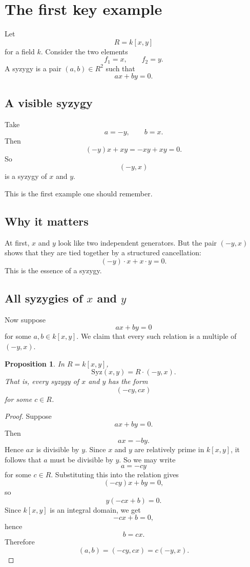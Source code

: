 \documentclass[11pt]{article}
\newtheorem{proposition}[theorem]{Proposition}
\theoremstyle{definition}
\theoremstyle{remark}
\newcommand{\Syz}{\mathrm{Syz}}
\begin{document}
	\section{The first key example}
	
	Let
	\[
	R = k[x,y]
	\]
	for a field \(k\). Consider the two elements
	\[
	f_1=x,\qquad f_2=y.
	\]
	A syzygy is a pair \((a,b)\in R^2\) such that
	\[
	ax+by=0.
	\]
	
	\subsection{A visible syzygy}
	
	Take
	\[
	a=-y,\qquad b=x.
	\]
	Then
	\[
	(-y)x + x y = -xy+xy=0.
	\]
	So
	\[
	(-y,x)
	\]
	is a syzygy of \(x\) and \(y\).
	
	This is the first example one should remember.
	
	\subsection{Why it matters}
	
	At first, \(x\) and \(y\) look like two independent generators. But the pair \((-y,x)\) shows that they are tied together by a structured cancellation:
	\[
	(-y)\cdot x + x\cdot y = 0.
	\]
	This is the essence of a syzygy.
	
	\subsection{All syzygies of \(x\) and \(y\)}
	
	Now suppose
	\[
	ax+by=0
	\]
	for some \(a,b\in k[x,y]\). We claim that every such relation is a multiple of \((-y,x)\).
	
	\begin{proposition}
		In \(R=k[x,y]\),
		\[
		\Syz(x,y)=R\cdot(-y,x).
		\]
		That is, every syzygy of \(x\) and \(y\) has the form
		\[
		(-cy,cx)
		\]
		for some \(c\in R\).
	\end{proposition}
	
	\begin{proof}
		Suppose
		\[
		ax+by=0.
		\]
		Then
		\[
		ax=-by.
		\]
		Hence \(ax\) is divisible by \(y\). Since \(x\) and \(y\) are relatively prime in \(k[x,y]\), it follows that \(a\) must be divisible by \(y\). So we may write
		\[
		a=-cy
		\]
		for some \(c\in R\). Substituting this into the relation gives
		\[
		(-cy)x+by=0,
		\]
		so
		\[
		y(-cx+b)=0.
		\]
		Since \(k[x,y]\) is an integral domain, we get
		\[
		-cx+b=0,
		\]
		hence
		\[
		b=cx.
		\]
		Therefore
		\[
		(a,b)=(-cy,cx)=c(-y,x).
		\]
	\end{proof}
	
\end{document}

